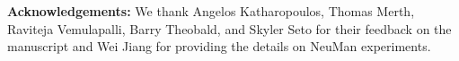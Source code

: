 \small{
\noindent
{\bf Acknowledgements:} We thank Angelos Katharopoulos, Thomas Merth, Raviteja Vemulapalli, Barry Theobald, and Skyler Seto for their feedback on the manuscript and Wei Jiang for providing the details on NeuMan experiments.
}